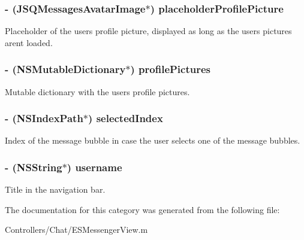 \subsubsection[{placeholder\+Profile\+Picture}]{\setlength{\rightskip}{0pt plus 5cm}-\/ (J\+S\+Q\+Messages\+Avatar\+Image$\ast$) placeholder\+Profile\+Picture\hspace{0.3cm}{\ttfamily [protected]}}\label{category_e_s_messenger_view_07_08_a80d4d7c99145b51c56e260655416ad7b}
Placeholder of the users\textquotesingle{} profile picture, displayed as long as the users\textquotesingle{} pictures aren\textquotesingle{}t loaded. \hypertarget{category_e_s_messenger_view_07_08_add298c7e0599ca792f67afe524bdf3d2}{}
\subsubsection[{profile\+Pictures}]{\setlength{\rightskip}{0pt plus 5cm}-\/ (N\+S\+Mutable\+Dictionary$\ast$) profile\+Pictures\hspace{0.3cm}{\ttfamily [protected]}}\label{category_e_s_messenger_view_07_08_add298c7e0599ca792f67afe524bdf3d2}
Mutable dictionary with the users\textquotesingle{} profile pictures. \hypertarget{category_e_s_messenger_view_07_08_a11c09575d840699174290d09551b78f5}{}
\subsubsection[{selected\+Index}]{\setlength{\rightskip}{0pt plus 5cm}-\/ (N\+S\+Index\+Path$\ast$) selected\+Index\hspace{0.3cm}{\ttfamily [protected]}}\label{category_e_s_messenger_view_07_08_a11c09575d840699174290d09551b78f5}
Index of the message bubble in case the user selects one of the message bubbles. \hypertarget{category_e_s_messenger_view_07_08_a59c65c6e1e6019569ca8a58e7da563de}{}
\subsubsection[{username}]{\setlength{\rightskip}{0pt plus 5cm}-\/ (N\+S\+String$\ast$) username\hspace{0.3cm}{\ttfamily [protected]}}\label{category_e_s_messenger_view_07_08_a59c65c6e1e6019569ca8a58e7da563de}
Title in the navigation bar. 

The documentation for this category was generated from the following file\+:\begin{DoxyCompactItemize}
\item 
Controllers/\+Chat/E\+S\+Messenger\+View.\+m\end{DoxyCompactItemize}
